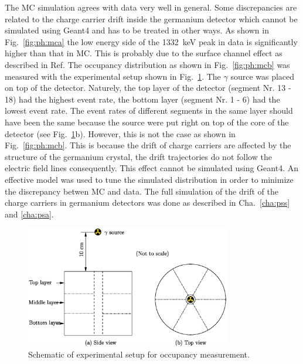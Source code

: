 The MC simulation agrees with data very well in general. Some discrepancies are related to the charge carrier drift inside the germanium detector which cannot be simulated using Geant4 and has to be treated in other ways. As shown in Fig.~\ref{fig:ph:mca} the low energy side of the 1332~keV peak in data is significantly higher than that in MC. This is probably due to the surface channel effect as described in Ref\cite{Sur05}. The occupancy distribution as shown in Fig.~\ref{fig:ph:mcb} was measured with the experimental setup shown in Fig.~\ref{fig:ph:occ}. The $\gamma$ source was placed on top of the detector. Naturely, the top layer of the detector (segment Nr. 13 - 18) had the highest event rate, the bottom layer (segment Nr. 1 - 6) had the lowest event rate. The event rates of different segments in the same layer should have been the same because the source were put right on top of the core of the detector (see Fig.~\ref{fig:ph:occ}b). However, this is not the case as shown in Fig.~\ref{fig:ph:mcb}. This is because the drift of charge carriers are affected by the structure of the germanium crystal, the drift trajectories do not follow the electric field lines consequently. This effect cannot be simulated using Geant4. An effective model was used to tune the simulated distribution in order to minimize the discrepancy betwen MC and data. The full simulation of the drift of the charge carriers in germanium detectors was done as described in Cha.~\ref{cha:pss} and \ref{cha:psa}.

\begin{figure}[htbp]
\centering
\includegraphics[width=0.8\textwidth]{occumea}
\caption{Schematic of experimental setup for occupancy measurement.}
\label{fig:ph:occ}
\end{figure}

